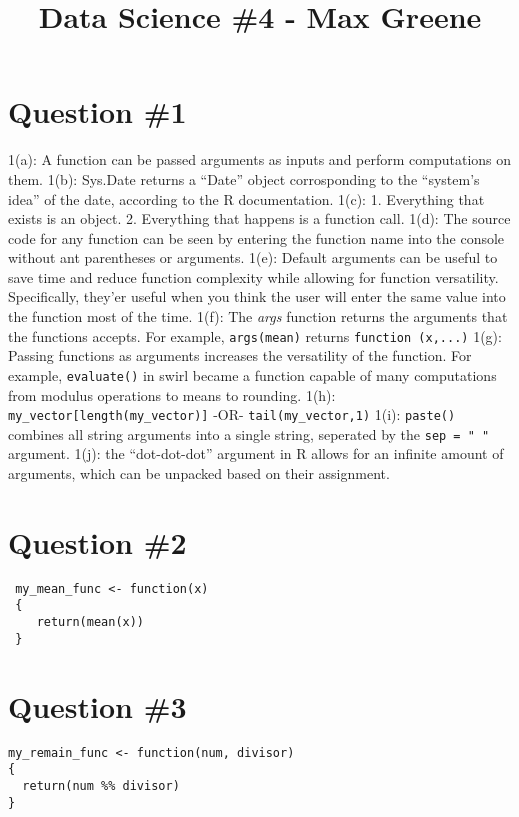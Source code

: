 \documentclass[]{article}
\title{Data Science \#4 - Max Greene}
\author{}
\date{}
\begin{document}
\maketitle

\section{Question \#1}\label{question-1}

1(a): A function can be passed arguments as inputs and perform
computations on them. 1(b): Sys.Date returns a ``Date'' object
corrosponding to the ``system's idea'' of the date, according to the R
documentation. 1(c): 1. Everything that exists is an object. 2.
Everything that happens is a function call. 1(d): The source code for
any function can be seen by entering the function name into the console
without ant parentheses or arguments. 1(e): Default arguments can be
useful to save time and reduce function complexity while allowing for
function versatility. Specifically, they'er useful when you think the
user will enter the same value into the function most of the time. 1(f):
The \emph{args} function returns the arguments that the functions
accepts. For example, \texttt{args(mean)} returns
\texttt{function\ (x,...)} 1(g): Passing functions as arguments
increases the versatility of the function. For example,
\texttt{evaluate()} in swirl became a function capable of many
computations from modulus operations to means to rounding. 1(h):
\texttt{my\_vector{[}length(my\_vector){]}} -OR-
\texttt{tail(my\_vector,1)} 1(i): \texttt{paste()} combines all string
arguments into a single string, seperated by the \texttt{sep\ =\ "\ "}
argument. 1(j): the ``dot-dot-dot'' argument in R allows for an infinite
amount of arguments, which can be unpacked based on their assignment.

\section{Question \#2}\label{question-2}

\begin{verbatim}
 my_mean_func <- function(x)
 {
    return(mean(x))
 }
\end{verbatim}

\section{Question \#3}\label{question-3}

\begin{verbatim}
my_remain_func <- function(num, divisor)
{
  return(num %% divisor)
}
\end{verbatim}
\end{document}
